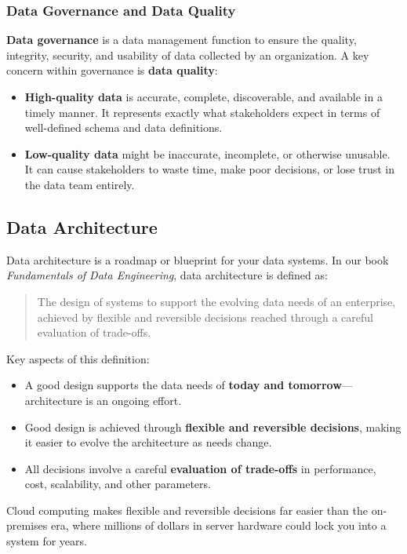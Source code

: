 \documentclass{article}
\begin{document}
\subsubsection{Data Governance and Data Quality}
\textbf{Data governance} is a data management function to ensure the quality, integrity, security, and usability of data collected by an organization. A key concern within governance is \textbf{data quality}:
\begin{itemize}
    \item \textbf{High-quality data} is accurate, complete, discoverable, and available in a timely manner. It represents exactly what stakeholders expect in terms of well-defined schema and data definitions.
    \item \textbf{Low-quality data} might be inaccurate, incomplete, or otherwise unusable. It can cause stakeholders to waste time, make poor decisions, or lose trust in the data team entirely.
\end{itemize}

\subsection{Data Architecture}
Data architecture is a roadmap or blueprint for your data systems. In our book \textit{Fundamentals of Data Engineering}, data architecture is defined as:
\begin{quote}
    The design of systems to support the evolving data needs of an enterprise, achieved by flexible and reversible decisions reached through a careful evaluation of trade-offs.
\end{quote}

Key aspects of this definition:
\begin{itemize}
    \item A good design supports the data needs of \textbf{today and tomorrow}---architecture is an ongoing effort.
    \item Good design is achieved through \textbf{flexible and reversible decisions}, making it easier to evolve the architecture as needs change.
    \item All decisions involve a careful \textbf{evaluation of trade-offs} in performance, cost, scalability, and other parameters.
\end{itemize}
Cloud computing makes flexible and reversible decisions far easier than the on-premises era, where millions of dollars in server hardware could lock you into a system for years.
\end{document}
